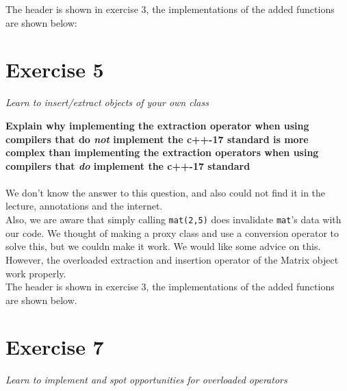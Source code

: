 \documentclass[12pt]{article}
\newcommand{\desc}[1]{\textit{#1} \vspace{1em}}
\begin{document}
The header is shown in exercise 3, the implementations of the added functions are shown below:






\clearpage
\section*{Exercise 5}
\desc{Learn to insert/extract objects of your own class}

\textbf{Explain why implementing the extraction operator when using compilers that do \emph{not} implement the c++-17 standard is more complex than implementing the extraction operators when using compilers that \emph{do} implement the c++-17 standard}\\\\
We don't know the answer to this question, and also could not find it in the lecture, annotations and the internet.\\
Also, we are aware that simply calling \texttt{mat(2,5)} does invalidate \texttt{mat}'s data with our code. We thought of making a proxy class and use a conversion operator to solve this, but we couldn make it work. We would like some advice on this. However, the overloaded extraction and insertion operator of the Matrix object work properly.\\
The header is shown in exercise 3, the implementations of the added functions are shown below. 








\clearpage
\section*{Exercise 7}
\desc{Learn to implement and spot opportunities for overloaded operators}
\end{document}
